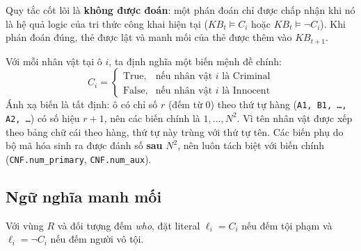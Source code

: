 \documentclass{article}
\newcommand{\code}[1]{\texttt{#1}}
\newcommand{\KB}{\mathit{KB}}
\begin{document}
Quy tắc cốt lõi là \textbf{không được đoán}: một phán đoán chỉ được chấp nhận khi nó là hệ quả logic của tri thức công khai hiện tại ($\KB_t \models C_i$ hoặc $\KB_t \models \neg C_i$). Khi phán đoán đúng, thẻ được lật và manh mối của thẻ được thêm vào $\KB_{t+1}$.

Với mỗi nhân vật tại ô $i$, ta định nghĩa một biến mệnh đề chính:
\begin{equation}
C_i =
\begin{cases}
\text{True}, & \text{nếu nhân vật } i \text{ là Criminal} \\
\text{False}, & \text{nếu nhân vật } i \text{ là Innocent}
\end{cases}
\end{equation}
Ánh xạ biến là tất định: ô có chỉ số $r$ (đếm từ 0) theo thứ tự hàng (\code{A1, B1, \dots, A2, \dots}) có số hiệu $r+1$, nên các biến chính là $1,\dots,N^2$. Vì tên nhân vật được xếp theo bảng chữ cái theo hàng, thứ tự này trùng với thứ tự tên. Các biến phụ do bộ mã hóa sinh ra được đánh số \textbf{sau} $N^2$, nên luôn tách biệt với biến chính (\code{CNF.num\_primary}, \code{CNF.num\_aux}).

\subsection{Ngữ nghĩa manh mối}
Với vùng $R$ và đối tượng đếm \textit{who}, đặt literal $\ell_i = C_i$ nếu đếm tội phạm và $\ell_i = \neg C_i$ nếu đếm người vô tội.
\end{document}
